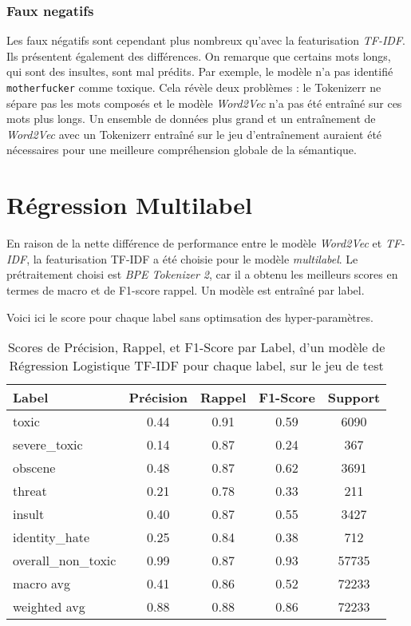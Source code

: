 \subsubsection{Faux negatifs}
Les faux négatifs sont cependant plus nombreux qu'avec la featurisation \textit{TF-IDF}. 
Ils présentent également des différences. On remarque que certains mots longs, qui sont des insultes, sont mal prédits. 
Par exemple, le modèle n'a pas identifié \texttt{motherfucker} comme toxique. 
Cela révèle deux problèmes : le Tokenizerr ne sépare pas les mots composés et le modèle \textit{Word2Vec} n'a pas été entraîné sur ces mots plus longs. 
Un ensemble de données plus grand et un entraînement de \textit{Word2Vec} avec un Tokenizerr entraîné sur le jeu d'entraînement auraient été nécessaires pour une meilleure compréhension globale de la sémantique.

\section{Régression Multilabel}
En raison de la nette différence de performance entre le modèle \textit{Word2Vec} et \textit{TF-IDF}, la featurisation TF-IDF a été choisie pour le modèle \textit{multilabel}. 
Le prétraitement choisi est \textit{BPE Tokenizer 2}, car il a obtenu les meilleurs scores en termes de macro et de F1-score rappel. 
Un modèle est entraîné par label.

Voici ici le score pour chaque label sans optimsation des hyper-paramètres.
\begin{table}[ht]
    \centering
    \caption{Scores de Précision, Rappel, et F1-Score par Label, d'un modèle de Régression Logistique TF-IDF pour chaque label, sur le jeu de test}
    \begin{tabular}{lcccc}
    \hline
    \textbf{Label} & \textbf{Précision} & \textbf{Rappel} & \textbf{F1-Score} & \textbf{Support} \\ \hline
    toxic          & 0.44               & 0.91            & 0.59              & 6090             \\
    severe\_toxic  & 0.14               & 0.87            & 0.24              & 367              \\
    obscene        & 0.48               & 0.87            & 0.62              & 3691             \\
    threat         & 0.21               & 0.78            & 0.33              & 211              \\
    insult         & 0.40               & 0.87            & 0.55              & 3427             \\
    identity\_hate & 0.25               & 0.84            & 0.38              & 712              \\
    overall\_non\_toxic & 0.99           & 0.87            & 0.93              & 57735            \\\hline
    macro avg      & 0.41               & 0.86            & 0.52              & 72233            \\
    weighted avg   & 0.88               & 0.88            & 0.86              & 72233            \\
    \end{tabular}
    \label{tab:scores}
\end{table}
